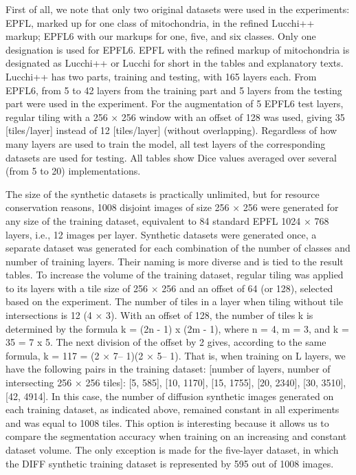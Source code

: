 \documentclass[journal,article,submit,pdftex,moreauthors]{Definitions/mdpi}
\begin{document}
First of all, we note that only two original datasets were used in the experiments: EPFL, marked up for one class of mitochondria, in the refined Lucchi++ markup; EPFL6 with our markups for one, five, and six classes. Only one designation is used for EPFL6. EPFL with the refined markup of mitochondria is designated as Lucchi++ or Lucchi for short in the tables and explanatory texts. Lucchi++ has two parts, training and testing, with 165 layers each. From EPFL6, from 5 to 42 layers from the training part and 5 layers from the testing part were used in the experiment. For the augmentation of 5 EPFL6 test layers, regular tiling with a 256 × 256 window with an offset of 128 was used, giving 35 [tiles/layer] instead of 12 [tiles/layer] (without overlapping). Regardless of how many layers are used to train the model, all test layers of the corresponding datasets are used for testing. All tables show Dice values averaged over several (from 5 to 20) implementations.

The size of the synthetic datasets is practically unlimited, but for resource conservation reasons, 1008 disjoint images of size 256 × 256 were generated for any size of the training dataset, equivalent to 84 standard EPFL 1024 × 768 layers, i.e., 12 images per layer. Synthetic datasets were generated once, a separate dataset was generated for each combination of the number of classes and number of training layers. Their naming is more diverse and is tied to the result tables. To increase the volume of the training dataset, regular tiling was applied to its layers with a tile size of 256 × 256 and an offset of 64 (or 128), selected based on the experiment. The number of tiles in a layer when tiling without tile intersections is 12 (4 × 3). With an offset of 128, the number of tiles k is determined by the formula k = (2n - 1) x (2m - 1), where n = 4, m = 3, and k = 35 = 7 x 5. The next division of the offset by 2 gives, according to the same formula, k = 117 = (2 × 7– 1)(2 × 5– 1). That is, when training on L layers, we have the following pairs in the training dataset: [number of layers, number of intersecting 256 × 256 tiles]: [5, 585], [10, 1170], [15, 1755], [20, 2340], [30, 3510], [42, 4914]. In this case, the number of diffusion synthetic images generated on each training dataset, as indicated above, remained constant in all experiments and was equal to 1008 tiles. This option is interesting because it allows us to compare the segmentation accuracy when training on an increasing and constant dataset volume. The only exception is made for the five-layer dataset, in which the DIFF synthetic training dataset is represented by 595 out of 1008 images.
\end{document}
